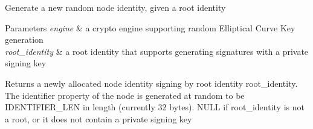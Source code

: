 Generate a new random node identity, given a root identity


\begin{DoxyParams}{Parameters}
{\em engine} & a crypto engine supporting random Elliptical Curve Key generation \\
\hline
{\em root\+\_\+identity} & a root identity that supports generating signatures with a private signing key \\
\hline
\end{DoxyParams}
\begin{DoxyReturn}{Returns}
a newly allocated node identity signing by root identity \textquotesingle{}root\+\_\+identity\textquotesingle{}. The \textquotesingle{}identifier\textquotesingle{} property of the node is generated at random to be \textquotesingle{}I\+D\+E\+N\+T\+I\+F\+I\+E\+R\+\_\+\+L\+EN\textquotesingle{} in length (currently 32 bytes). N\+U\+LL if root\+\_\+identity is not a root, or it does not contain a private signing key 
\end{DoxyReturn}
